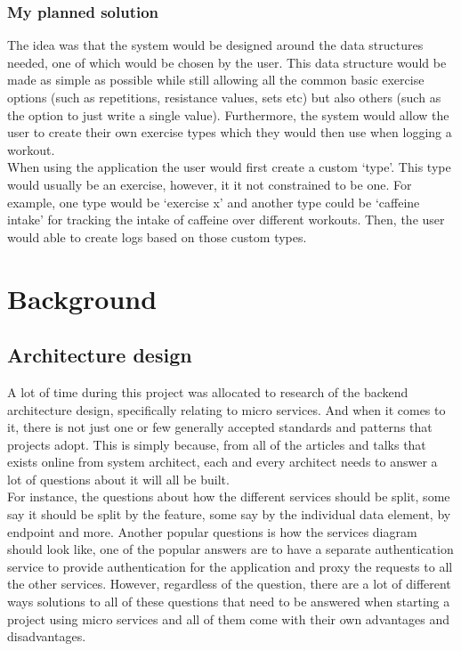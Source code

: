 \documentclass{article}
\newcommand{\vspaceconst}{-2ex}
\begin{document}
\begin{multicols}{2}
\subsubsection{My planned solution}
\vspace{\vspaceconst}

The idea was that the system would be designed around the data structures needed, one of which would be chosen by the user. This data structure would be made as simple as possible while still allowing all the common basic exercise options (such as repetitions, resistance values, sets etc) but also others (such as the option to just write a single value). Furthermore, the system would allow the user to create their own exercise types which they would then use when logging a workout.\\
When using the application the user would first create a custom `type'. This type would usually be an exercise, however, it it not constrained to be one. For example, one type would be `exercise x' and another type could be `caffeine intake' for tracking the intake of caffeine over different workouts. Then, the user would able to create logs based on those custom types.\\

\section{Background}
\vspace{\vspaceconst}

\subsection{Architecture design}
\vspace{\vspaceconst}

A lot of time during this project was allocated to research of the backend architecture design, specifically relating to micro services. And when it comes to it, there is not just one or few generally accepted standards and patterns that projects adopt. This is simply because, from all of the articles and talks that exists online from system architect, each and every architect needs to answer a lot of questions about it will all be built.\\
 For instance, the questions about how the different services should be split, some say it should be split by the feature, some say by the individual data element, by endpoint and more. Another popular questions is how the services diagram should look like, one of the popular answers are to have a separate authentication service to provide authentication for the application and proxy the requests to all the other services. However, regardless of the question, there are a lot of different ways solutions to all of these questions that need to be answered when starting a project using micro services and all of them come with their own advantages and disadvantages.\\


\end{multicols}
\end{document}
